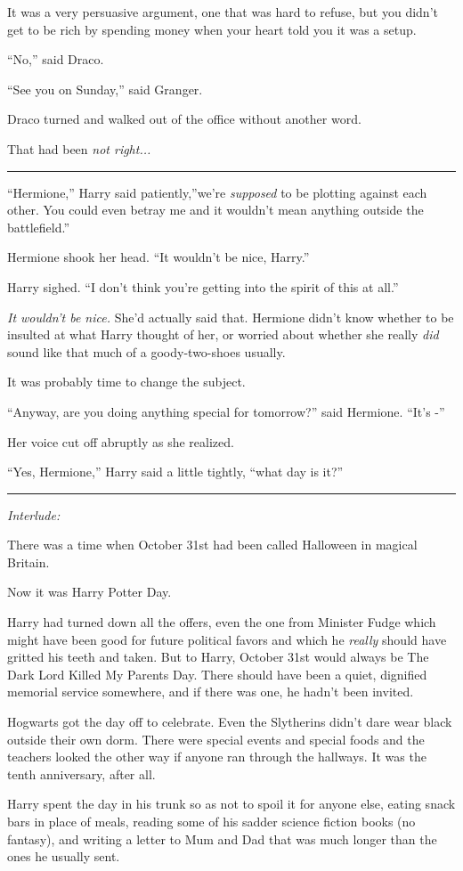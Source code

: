 It was a very persuasive argument, one that was hard to refuse, but you
didn't get to be rich by spending money when your heart told you it was
a setup.

``No,'' said Draco.

``See you on Sunday,'' said Granger.

Draco turned and walked out of the office without another word.

That had been \emph{not right...}

\begin{center}\rule{3in}{0.4pt}\end{center}

``Hermione,'' Harry said patiently,''we're \emph{supposed} to be
plotting against each other. You could even betray me and it wouldn't
mean anything outside the battlefield.''

Hermione shook her head. ``It wouldn't be nice, Harry.''

Harry sighed. ``I don't think you're getting into the spirit of this at
all.''

\emph{It wouldn't be nice.} She'd actually said that. Hermione didn't
know whether to be insulted at what Harry thought of her, or worried
about whether she really \emph{did} sound like that much of a
goody-two-shoes usually.

It was probably time to change the subject.

``Anyway, are you doing anything special for tomorrow?'' said Hermione.
``It's -''

Her voice cut off abruptly as she realized.

``Yes, Hermione,'' Harry said a little tightly, ``what day is it?''

\begin{center}\rule{3in}{0.4pt}\end{center}

\emph{Interlude:}

There was a time when October 31st had been called Halloween in magical
Britain.

Now it was Harry Potter Day.

Harry had turned down all the offers, even the one from Minister Fudge
which might have been good for future political favors and which he
\emph{really} should have gritted his teeth and taken. But to Harry,
October 31st would always be The Dark Lord Killed My Parents Day. There
should have been a quiet, dignified memorial service somewhere, and if
there was one, he hadn't been invited.

Hogwarts got the day off to celebrate. Even the Slytherins didn't dare
wear black outside their own dorm. There were special events and special
foods and the teachers looked the other way if anyone ran through the
hallways. It was the tenth anniversary, after all.

Harry spent the day in his trunk so as not to spoil it for anyone else,
eating snack bars in place of meals, reading some of his sadder science
fiction books (no fantasy), and writing a letter to Mum and Dad that was
much longer than the ones he usually sent.
